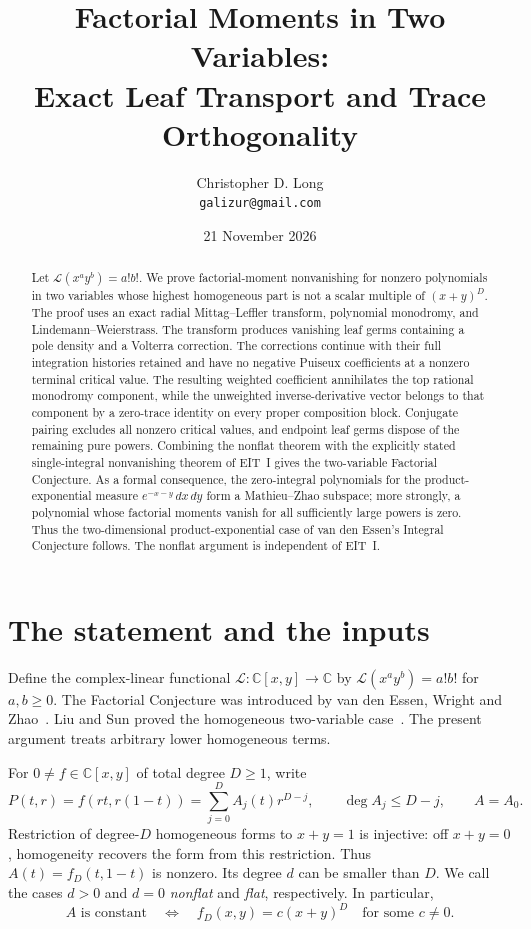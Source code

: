 \documentclass[11pt]{article}
\title{Factorial Moments in Two Variables:\\
Exact Leaf Transport and Trace Orthogonality}
\author{Christopher D. Long\\\small\texttt{galizur@gmail.com}}
\date{21 November 2026}
\numberwithin{equation}{section}
\theoremstyle{definition}\newtheorem{definition}[theorem]{Definition}
\theoremstyle{remark}\newtheorem{remark}[theorem]{Remark}
\newcommand{\C}{\mathbb C}
\newcommand{\Lfac}{\mathcal L}
\newcommand{\dd}{\,d}
\begin{document}
\maketitle
\begin{abstract}
Let $\Lfac(x^ay^b)=a!b!$. We prove factorial-moment nonvanishing for
nonzero polynomials in two variables whose highest homogeneous part is
not a scalar multiple of $(x+y)^D$. The proof uses an exact radial
Mittag--Leffler transform, polynomial monodromy, and
Lindemann--Weierstrass. The transform produces vanishing leaf germs
containing a pole density and a Volterra correction. The corrections
continue with their full integration histories retained and have no
negative Puiseux coefficients at a nonzero terminal critical value.
The resulting weighted coefficient annihilates the top rational
monodromy component, while the unweighted inverse-derivative vector
belongs to that component by a zero-trace identity on every proper
composition block. Conjugate pairing excludes all nonzero critical
values, and endpoint leaf germs dispose of the remaining pure powers.
Combining the nonflat theorem with the explicitly stated
single-integral nonvanishing theorem of EIT~I gives the two-variable
Factorial Conjecture. As a formal consequence, the zero-integral
polynomials for the product-exponential measure
$e^{-x-y}\dd x\dd y$ form a Mathieu--Zhao subspace; more strongly,
a polynomial whose factorial moments vanish for all sufficiently large
powers is zero. Thus the two-dimensional product-exponential case of
van den Essen's Integral Conjecture follows. The nonflat argument is independent of EIT~I.
\end{abstract}

\section{The statement and the inputs}\label{sec:introduction}
Define the complex-linear functional $\Lfac:\C[x,y]\to\C$ by
$\Lfac(x^ay^b)=a!b!$ for $a,b\ge0$. The Factorial Conjecture was introduced
by van den Essen, Wright and Zhao~\cite{FC}. Liu and Sun proved the
homogeneous two-variable case~\cite{LiuSun}. The present argument treats
arbitrary lower homogeneous terms.

For $0\ne f\in\C[x,y]$ of total degree $D\ge1$, write
\begin{equation}\label{eq:radial-polynomial}
 P(t,r)=f(rt,r(1-t))=\sum_{j=0}^{D}A_j(t)r^{D-j},
 \qquad \deg A_j\le D-j,\qquad A=A_0.
\end{equation}
Restriction of degree-$D$ homogeneous forms to $x+y=1$ is injective:
off $x+y=0$, homogeneity recovers the form from this restriction.
Thus $A(t)=f_D(t,1-t)$ is nonzero. Its degree $d$ can be smaller than $D$.
We call the cases $d>0$ and $d=0$ \emph{nonflat} and \emph{flat}, respectively.
In particular,
\[
 A\text{ is constant}\quad\Longleftrightarrow\quad
 f_D(x,y)=c(x+y)^D\quad\text{for some }c\ne0.
\]
\end{document}
